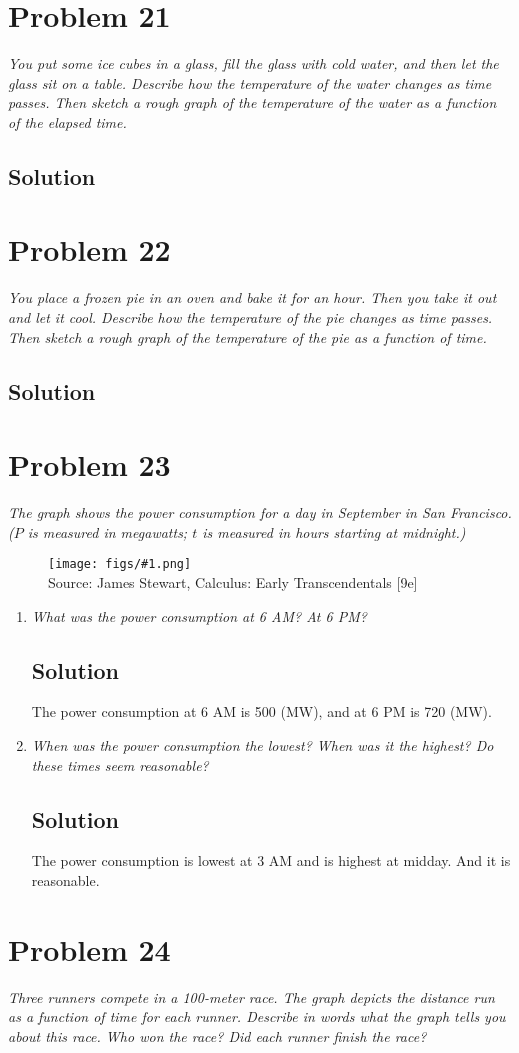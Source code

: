 \documentclass[11pt]{article}
\newcommand{\soln}{\subsection*}
\newcommand{\qn}{\textit}
\newcommand{\imagesource}[1]{{\footnotesize Source: #1}}
\newcommand{\imgqn}[1]{
	\begin{figure}[H]
		\centering
		\texttt{[image: figs/\#1.png]}\\
		\imagesource{James Stewart, Calculus: Early Transcendentals [9e]}
	\end{figure}
}
\begin{document}
\section*{Problem 21}

\qn{You put some ice cubes in a glass, fill the glass with cold water, and then let the glass sit on a table. Describe how the temperature of the water changes as time passes. Then sketch a rough graph of the temperature of the water as a function of the elapsed time.}

\soln{Solution}

\section*{Problem 22}

\qn{You place a frozen pie in an oven and bake it for an hour. Then you take it out and let it cool. Describe how the temperature of the pie changes as time passes. Then sketch a rough graph of the temperature of the pie as a function of time.}

\soln{Solution}

\section*{Problem 23}

\qn{The graph shows the power consumption for a day in September in San Francisco. ($P$ is measured in megawatts; $t$ is measured in hours starting at midnight.)}

\imgqn{1.1.23}

\begin{enumerate}
	\item \qn{What was the power consumption at 6 AM? At 6 PM?}
	\soln{Solution}
	The power consumption at 6 AM is 500 (MW), and at 6 PM is 720 (MW).
	
	\item \qn{When was the power consumption the lowest? When was it the highest? Do these times seem reasonable?}
	\soln{Solution}
	The power consumption is lowest at 3 AM and is highest at midday. And it is reasonable.
\end{enumerate}


\section*{Problem 24}

\qn{Three runners compete in a 100-meter race. The graph depicts the distance run as a function of time for each runner. Describe in words what the graph tells you about this race. Who won the race? Did each runner finish the race?}
\end{document}
